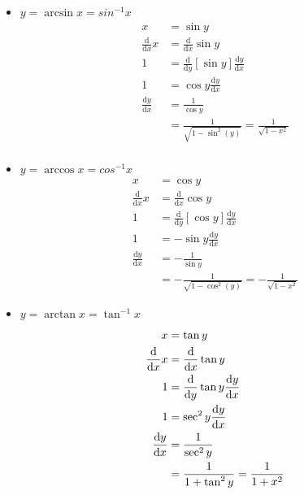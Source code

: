\documentclass[12pt]{article}
\begin{document}
\begin{itemize}
    \item $y = \arcsin x = sin^{-1}x$
    \begin{equation}
    \begin{split}
        x &= \sin y \\
        \frac{\text{d}}{\text{d}x}x &= \frac{\text{d}}{\text{d}x} \sin y\\
        1 &= \frac{\text{d}}{\text{d}y}[\sin y]\frac{\text{d}y}{\text{d}x}\\
        1 &= \cos y \frac{\text{d}y}{\text{d}x}\\
        \frac{\text{d}y}{\text{d}x} &= \frac{1}{\cos y}\\
        &= \frac{1}{\sqrt{1-\sin^2(y)}} = \frac{1}{\sqrt{1-x^2}}\\
    \end{split}        
\end{equation}

    \item $y = \arccos x = cos^{-1}x$
    \begin{equation}
        \begin{split}
            x &= \cos y\\
            \frac{\text{d}}{\text{d}x} x &= \frac{\text{d}}{\text{d}x} \cos y\\
            1 &= \frac{\text{d}}{\text{d}y}[\cos y] \frac{\text{d}y}{\text{d}x}\\
            1 &= -\sin y \frac{\text{d}y}{\text{d}x}\\
            \frac{\text{d}y}{\text{d}x} &= -\frac{1}{\sin y}\\
            &= -\frac{1}{\sqrt{1-\cos^2(y)}} = -\frac{1}{\sqrt{1-x^2}}
        \end{split}
    \end{equation}

    \item $y = \arctan x = \tan^{-1} x$
    \begin{equation}
        \begin{split}
            x &= \tan y\\
            \frac{\text{d}}{\text{d}x} x &= \frac{\text{d}}{\text{d}x} \tan y\\
            1 &= \frac{\text{d}}{\text{d}y} \tan y \frac{\text{d}y}{\text{d}x}\\
            1 &= \sec^2 y \frac{\text{d}y}{\text{d}x}\\
            \frac{\text{d}y}{\text{d}x} &= \frac{1}{\sec^2 y}\\
            &= \frac{1}{1+\tan^2 y} = \frac{1}{1+x^2}\\
        \end{split}
    \end{equation}
\end{itemize}
\end{document}
